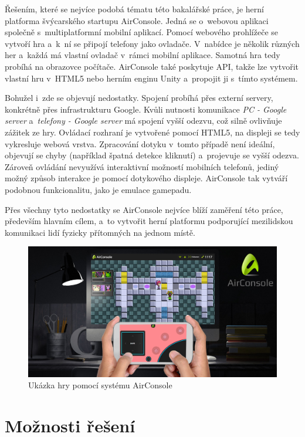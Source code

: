 \documentclass[thesis=B,czech,hidelinks]{FITthesis}[2012/06/26] %
\begin{document}
Řešením, které se nejvíce podobá tématu této bakalářské práce, je herní platforma švýcarského startupu AirConsole\cite{airconsole}. Jedná se o~webovou aplikaci společně s~multiplatformní mobilní aplikací. Pomocí webového prohlížeče se vytvoří hra a~k~ní se připojí telefony jako ovladače. V~nabídce je několik různých her a~každá má vlastní ovladač v~rámci mobilní aplikace. Samotná hra tedy probíhá na obrazovce počítače. AirConsole také poskytuje API, takže lze vytvořit vlastní hru v~HTML5 nebo herním enginu Unity a~propojit ji s~tímto systémem.

Bohužel i~zde se objevují nedostatky. Spojení probíhá přes externí servery, konkrétně přes infrastrukturu Google\cite{airconsole}. Kvůli nutnosti komunikace \textit{PC - Google server} a~\textit{telefony - Google server} má spojení vyšší odezvu, což silně ovlivňuje zážitek ze hry. Ovládací rozhraní je vytvořené pomocí HTML5, na displeji se tedy vykresluje webová vrstva. Zpracování dotyku v~tomto případě není ideální, objevují se chyby (například špatná detekce kliknutí) a~projevuje se vyšší odezva. Zároveň ovládání nevyužívá interaktivní možností mobilních telefonů, jediný možný způsob interakce je pomocí dotykového displeje. AirConsole tak vytváří podobnou funkcionalitu, jako je emulace gamepadu.

Přes všechny tyto nedostatky se AirConsole nejvíce blíží zaměření této práce, především hlavním cílem, a~to vytvořit herní platformu podporující mezilidskou komunikaci lidí fyzicky přítomných na jednom místě.

\begin{figure}[h]
\includegraphics[width=\textwidth]{airconsole}
\caption{Ukázka hry pomocí systému AirConsole\cite{airconsole}}
\end{figure}

\section{Možnosti řešení}
\end{document}
